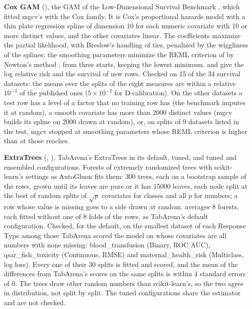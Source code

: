 \textbf{Cox GAM} (), the GAM of the Low-Dimensional Survival Benchmark
, which fitted mgcv's  with
the Cox family. It is Cox's proportional hazards model with a thin plate regression spline
 of dimension 10 for each numeric covariate with 10 or more distinct values, and the other covariates linear. The coefficients maximize the
partial likelihood, with Breslow's handling of ties, penalized by the wiggliness of the splines; the smoothing
parameters minimize the REML criterion of  by Newton's method
, from three starts, keeping the lowest minimum.  and  give the log relative risk and the
survival of new rows. Checked on 15 of the 34 survival datasets: the means over the splits of the eight measures are
within a relative $10^{-3}$ of the published ones ($5\times10^{-2}$ for D-calibration). On the other datasets a test row
has a level of a factor that no training row has (the benchmark imputes it at random), a smooth covariate has more than
2000 distinct values (mgcv builds its spline on 2000 drawn at random), or, on splits of 9 datasets listed in the test,
mgcv stopped at smoothing parameters whose REML criterion is higher than at those  reaches.

\textbf{ExtraTrees} (, ), TabArena's ExtraTrees
 in its default, tuned, and tuned and ensembled configurations.
Forests of extremely randomized trees  with scikit-learn's settings
as AutoGluon fits them: 300 trees, each on a bootstrap sample of the rows, grown until its leaves are pure or it has
15000 leaves, each node split at the best of random splits of $\sqrt{p}$ covariates for classes and all $p$ for
numbers; a row whose value is missing goes to a side drawn at random.  averages 8 forests, each
fitted without one of 8 folds of the rows, as TabArena's default configuration. Checked, for the default, on the
smallest dataset of each Response Type among those TabArena scored the model on whose covariates are all numbers with
none missing: blood\_transfusion (Binary, ROC AUC), qsar\_fish\_toxicity (Continuous, RMSE) and maternal\_health\_risk
(Multiclass, log loss). Every one of their 30 splits is fitted and scored, and the mean of the differences from
TabArena's scores on the same splits is within 4 standard errors of 0. The trees draw other random numbers than
scikit-learn's, so the two agree in distribution, not split by split. The tuned configurations share the estimator and
are not checked.

